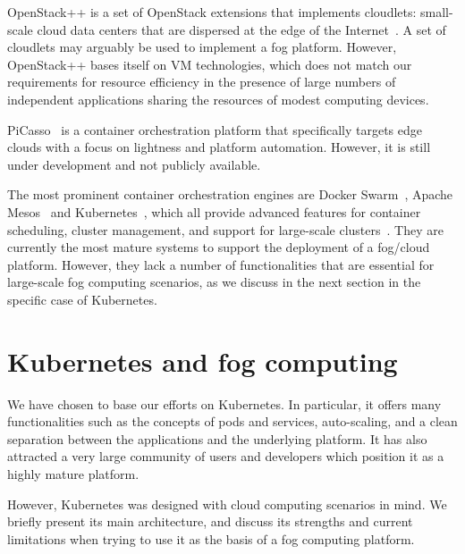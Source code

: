 \documentclass[letterpaper,twocolumn,10pt]{article}
\begin{document}

OpenStack++ is a set of OpenStack extensions that implements
cloudlets: small-scale cloud data centers that are dispersed at the
edge of the Internet~\cite{openstackplusplus}. A set of cloudlets may
arguably be used to implement a fog platform. However, OpenStack++
bases itself on VM technologies, which does not match our requirements
for resource efficiency in the presence of large numbers of
independent applications sharing the resources of modest computing
devices.

PiCasso~\cite{picasso} is a container orchestration platform that
specifically targets edge clouds with a focus on lightness and
platform automation. However, it is still under development and not
publicly available.

The most prominent container orchestration engines are Docker
Swarm~\cite{swarm}, Apache Mesos~\cite{mesos} and
Kubernetes~\cite{burns2016borg}, which all provide advanced features
for container scheduling, cluster management, and support for
large-scale clusters~\cite{kub-vs-swarm}. They are currently the most
mature systems to support the deployment of a fog/cloud
platform. However, they lack a number of functionalities that are
essential for large-scale fog computing scenarios, as we discuss in
the next section in the specific case of Kubernetes.

  
\section{Kubernetes and fog computing}\label{sec:kube}

We have chosen to base our efforts on Kubernetes.  In particular, it
offers many functionalities such as the concepts of pods and services,
auto-scaling, and a clean separation between the applications and the
underlying platform. It has also attracted a very large community of
users and developers which position it as a highly mature platform.

However, Kubernetes was designed with cloud computing scenarios in
mind. We briefly present its main architecture, and discuss its
strengths and current limitations when trying to use it as the basis
of a fog computing platform.
\end{document}
